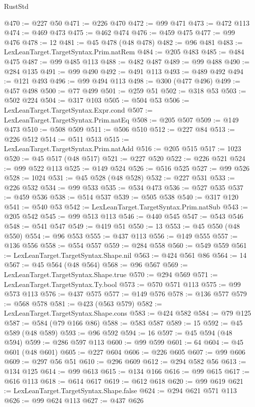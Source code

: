 \begin{lexlean}{RustStd}
\begin{coremodule}
@470 := @227 @50
@471 := @226 @470
@472 := @99 @471
@473 := @472 @113
@474 := @469 @473
@475 := @462 @474
@476 := @459 @475
@477 := @99 @476
@478 := 12
@481 := @45 @478 (@48 @478)
@482 := @96 @481
@483 := LexLeanTarget.TargetSyntax.Prim.natRem
@484 := @205 @483
@485 := @484 @475
@487 := @99 @485 @113
@488 := @482 @487
@489 := @99 @488
@490 := @284 @135
@491 := @99 @490
@492 := @491 @113
@493 := @489 @492
@494 := @121 @493
@496 := @99 @494 @113
@498 := @300 (@477 @496)
@499 := @457 @498
@500 := @77 @499
@501 := @259 @51
@502 := @318 @53
@503 := @502 @224
@504 := @317 @103
@505 := @504 @53
@506 := LexLeanTarget.TargetSyntax.Expr.cond
@507 := LexLeanTarget.TargetSyntax.Prim.natEq
@508 := @205 @507
@509 := @149 @473
@510 := @508 @509
@511 := @506 @510
@512 := @227 @84
@513 := @226 @512
@514 := @511 @513
@515 := LexLeanTarget.TargetSyntax.Prim.natAdd
@516 := @205 @515
@517 := 1023
@520 := @45 @517 (@48 @517)
@521 := @227 @520
@522 := @226 @521
@524 := @99 @522 @113
@525 := @149 @524
@526 := @516 @525
@527 := @99 @526
@528 := 1024
@531 := @45 @528 (@48 @528)
@532 := @227 @531
@533 := @226 @532
@534 := @99 @533
@535 := @534 @473
@536 := @527 @535
@537 := @459 @536
@538 := @514 @537
@539 := @505 @538
@540 := @317 @120
@541 := @540 @53
@542 := LexLeanTarget.TargetSyntax.Prim.natSub
@543 := @205 @542
@545 := @99 @513 @113
@546 := @440 @545
@547 := @543 @546
@548 := @541 @547
@549 := @419 @51
@550 := 13
@553 := @45 @550 (@48 @550)
@554 := @96 @553
@555 := @437 @113
@556 := @149 @555
@557 := @136 @556
@558 := @554 @557
@559 := @284 @558
@560 := @549 @559
@561 := LexLeanTarget.TargetSyntax.Shape.nil
@563 := @424 @561 @86
@564 := 14
@567 := @45 @564 (@48 @564)
@568 := @96 @567
@569 := LexLeanTarget.TargetSyntax.Shape.true
@570 := @294 @569
@571 := LexLeanTarget.TargetSyntax.Ty.bool
@573 := @570 @571 @113
@575 := @99 @573 @113
@576 := @437 @575
@577 := @149 @576
@578 := @136 @577
@579 := @568 @578
@581 := @423 (@563 @579)
@582 := LexLeanTarget.TargetSyntax.Shape.cons
@583 := @424 @582
@584 := @79 @125
@587 := @584 (@79 @166 @86)
@588 := @583 @587
@589 := 15
@592 := @45 @589 (@48 @589)
@593 := @96 @592
@594 := 16
@597 := @45 @594 (@48 @594)
@599 := @286 @597 @113
@600 := @99 @599
@601 := 64
@604 := @45 @601 (@48 @601)
@605 := @227 @604
@606 := @226 @605
@607 := @99 @606
@609 := @297 @56 @51
@610 := @296 @609
@612 := @294 @582 @56
@613 := @134 @125
@614 := @99 @613
@615 := @134 @166
@616 := @99 @615
@617 := @616 @113
@618 := @614 @617
@619 := @612 @618
@620 := @99 @619
@621 := LexLeanTarget.TargetSyntax.Shape.false
@624 := @294 @621 @571 @113
@626 := @99 @624 @113
@627 := @437 @626

\end{coremodule}
\end{lexlean}
